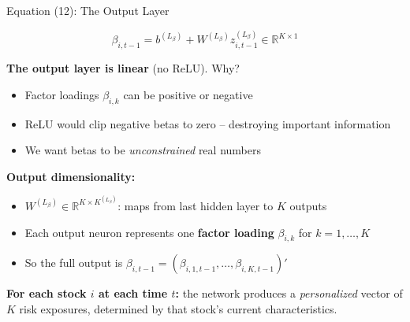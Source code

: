 \documentclass[aspectratio=169]{beamer}
\newcommand{\R}{\mathbb{R}}
\begin{document}
\begin{frame}{Equation (12): The Output Layer}

\[
\beta_{i,t-1} = b^{(L_\beta)} + W^{(L_\beta)} z^{(L_\beta)}_{i,t-1} \in \R^{K \times 1}
\]

\vspace{0.5em}
\textbf{The output layer is linear} (no ReLU). Why?
\begin{itemize}
    \item Factor loadings $\beta_{i,k}$ can be positive or negative
    \item ReLU would clip negative betas to zero -- destroying important information
    \item We want betas to be \emph{unconstrained} real numbers
\end{itemize}

\vspace{0.5em}
\textbf{Output dimensionality:}
\begin{itemize}
    \item $W^{(L_\beta)} \in \R^{K \times K^{(L_\beta)}}$: maps from last hidden layer to $K$ outputs
    \item Each output neuron represents one \textbf{factor loading} $\beta_{i,k}$ for $k = 1, \ldots, K$
    \item So the full output is $\beta_{i,t-1} = (\beta_{i,1,t-1}, \ldots, \beta_{i,K,t-1})'$
\end{itemize}

\vspace{0.5em}
\textbf{For each stock $i$ at each time $t$:} the network produces a \emph{personalized} vector of $K$ risk exposures, determined by that stock's current characteristics.
\end{frame}
%
%
\end{document}
